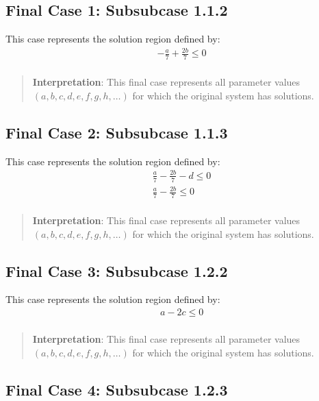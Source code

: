 \documentclass{article}
\newenvironment{stepdetail}
  {\begin{quote}\small\color{blue}}
  {\end{quote}}
\begin{document}
\subsection{Final Case 1: Subsubcase 1.1.2}

This case represents the solution region defined by:
\begin{align}
& - \frac{a}{7} + \frac{2 b}{7} \leq 0 \\
\end{align}

\begin{stepdetail}
\textbf{Interpretation}: This final case represents all parameter values
$(a, b, c, d, e, f, g, h, \ldots)$ for which the original system has solutions.
\end{stepdetail}

\subsection{Final Case 2: Subsubcase 1.1.3}

This case represents the solution region defined by:
\begin{align}
& \frac{a}{7} - \frac{2 b}{7} - d \leq 0 \\
& \frac{a}{7} - \frac{2 b}{7} \leq 0 \\
\end{align}

\begin{stepdetail}
\textbf{Interpretation}: This final case represents all parameter values
$(a, b, c, d, e, f, g, h, \ldots)$ for which the original system has solutions.
\end{stepdetail}

\subsection{Final Case 3: Subsubcase 1.2.2}

This case represents the solution region defined by:
\begin{align}
& a - 2 c \leq 0 \\
\end{align}

\begin{stepdetail}
\textbf{Interpretation}: This final case represents all parameter values
$(a, b, c, d, e, f, g, h, \ldots)$ for which the original system has solutions.
\end{stepdetail}

\subsection{Final Case 4: Subsubcase 1.2.3}
\end{document}
